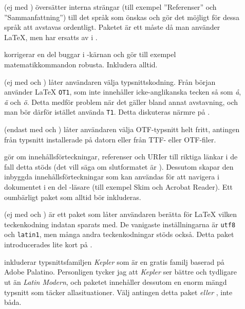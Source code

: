 \documentclass[lang=sv,ptsize=10pt,font=none,nomath,titles=bf,../../a4.tex]{subfiles}
\begin{document}
\begin{description}
	\item[] (ej med \XeTeX)
	översätter interna strängar (till exempel ”Referenser” och 
	”Sammanfattning”) till det språk som önskas och gör det möjligt för
	dessa språk att avstavas ordentligt. Paketet är ett måste då man
	använder \LaTeX, men har ersatts av  i \XeTeX.
	
	\item[]
	korrigerar en del buggar i \LaTeXe-kärnan och gör till 
	exempel matematikkommandon robusta. Inkludera alltid.
	
	\item[] (ej med \XeTeX och )
	låter användaren välja typsnittskodning. Från början använder \LaTeX{}
	\texttt{OT1}, som inte innehåller icke-anglikanska tecken så som
	\emph{å}, \emph{ä} och \emph{ö}. Detta medför problem när det gäller
	bland annat avstavning, och man bör därför istället använda 
	\texttt{T1}. Detta diskuteras närmre på .

	\item[] (endast med \XeTeX och )
	låter användaren välja \textsc{OTF}-typsnitt helt fritt, antingen
	från typsnitt installerade på datorn eller från \textsc{TTF}- eller
	\textsc{OTF}-filer.
	
	\item[]
	gör om innehållsförteckningar, referenser och URIer till riktiga
	länkar i de fall detta stöds (det vill säga om slutformatet är \PDF).
	Dessutom skapar den inbyggda innehållsförteckningar som kan användas
	för att navigera i dokumentet i en del \PDF-läsare (till exempel Skim
	och Acrobat Reader).
	Ett oumbärligt paket som alltid bör inkluderas.
	
	\item[] (ej med \XeTeX och )
	är ett paket som låter användaren berätta för \LaTeX{} vilken
	teckenkodning indatan sparats med. De vanigaste inställningarna är
	\texttt{utf8} och \texttt{latin1}, men många andra teckenkodningar
	stöds också.
	Detta paket introducerades lite kort på .

	\item[]
	inkluderar typsnittsfamiljen \emph{Kepler} som är en gratis familj
	baserad på Adobe Palatino. Personligen tycker jag att \emph{Kepler}
	ser bättre och tydligare ut än \emph{Latin Modern}, och paketet
	innehåller dessutom en enorm mängd typsnitt som täcker allasituationer.
	Välj antingen detta paket \emph{eller} , inte båda.
	

\end{description}
\end{document}
